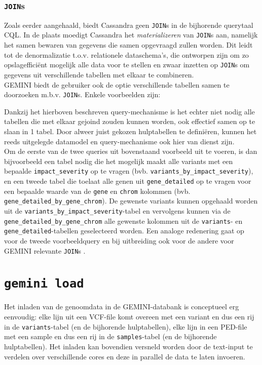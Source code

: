 \subsubsection{\texttt{JOIN}s}

Zoals eerder aangehaald, biedt Cassandra geen \texttt{JOIN}s in de bijhorende querytaal CQL. In de plaats moedigt Cassandra het \textit{materializeren} van \texttt{JOIN}s aan, namelijk het samen bewaren van gegevens die samen opgevraagd zullen worden. Dit leidt tot de denormalizatie t.o.v. relationele dataschema's, die ontworpen zijn om zo opslageffici\"ent mogelijk alle data voor te stellen en zwaar inzetten op \texttt{JOIN}s om gegevens uit verschillende tabellen met elkaar te combineren.\\
GEMINI biedt de gebruiker ook de optie verschillende tabellen samen te doorzoeken m.b.v. \texttt{JOIN}s. Enkele voorbeelden zijn:



Dankzij het hierboven beschreven query-mechanisme is het echter niet nodig alle tabellen die met elkaar gejoind zouden kunnen worden, ook effectief samen op te slaan in 1 tabel. Door alweer juist gekozen hulptabellen te defini\"eren, kunnen het reeds uitgelegde datamodel en query-mechanisme ook hier van dienst zijn.\\
Om de eerste van de twee queries uit bovenstaand voorbeeld uit te voeren, is dan bijvoorbeeld een tabel nodig die het mogelijk maakt alle variants met een bepaalde \texttt{impact\_severity} op te vragen (bvb. \texttt{variants\_by\_impact\_severity}), en een tweede tabel die toelaat alle genen uit \texttt{gene\_detailed} op te vragen voor een bepaalde waarde van de \texttt{gene} en \texttt{chrom} kolommen (bvb. \texttt{gene\_detailed\_by\_gene\_chrom}). De gewenste variants kunnen opgehaald worden uit de \texttt{variants\_by\_impact\_severity}-tabel en vervolgens kunnen via de \texttt{gene\_detailed\_by\_gene\_chrom} alle gewenste kolommen uit de \texttt{variants}- en \texttt{gene\_detailed}-tabellen geselecteerd worden. Een analoge redenering gaat op voor de tweede voorbeeldquery en bij uitbreiding ook voor de andere voor GEMINI relevante \texttt{JOIN}s \cite{gemini_joins}.

\section{\texttt{gemini load}}

Het inladen van de genoomdata in de GEMINI-databank is conceptueel erg eenvoudig: elke lijn uit een VCF-file komt overeen met een variant en dus een rij in de \texttt{variants}-tabel (en de bijhorende hulptabellen), elke lijn in een PED-file met een sample en dus een rij in de \texttt{samples}-tabel (en de bijhorende hulptabellen). Het inladen kan bovendien versneld worden door de text-input te verdelen over verschillende cores en deze in parallel de data te laten invoeren.

